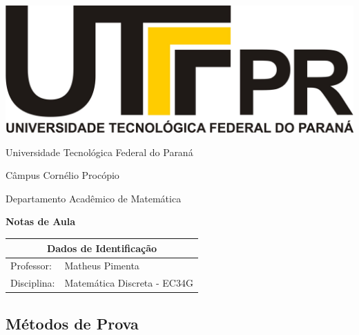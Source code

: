 \documentclass[oneside,a4paper,12pt]{article}
\newcommand{\universidade}{Universidade Tecnológica Federal do Paraná}
\newcommand{\centro}{Câmpus Cornélio Procópio}
\newcommand{\departamento}{Departamento Acadêmico de Matemática}
\newcommand{\curso}{Engenharia da Computação}
\newcommand{\professores}{Matheus Pimenta}
\newcommand{\disciplina}{Matemática Discreta - EC34G}
\begin{document}
	\begin{center}
		\includegraphics[width=\linewidth/8]{logo.jpg}%
	 	\vspace{2pt} 	
		
		\universidade
		\par
		\centro
		\par
		\departamento
		\par
		\par
		\vspace{12pt}
		\LARGE \textbf{Notas de Aula}
		
	\end{center}
	
	\vspace{12pt}
	
	\begin{tabular}{ |l|p{12cm}| }
		
		\hline
		\multicolumn{2}{|c|}{\textbf{Dados de Identificação}} \\
		\hline
		Professor:         &    \professores           \\
		\hline
		Disciplina:        &    \disciplina          \\
		\hline
		
	\end{tabular}
	\vspace{6pt}
	
	
	\begin{snugshade}
		\section{Métodos de Prova}
	\end{snugshade}
\end{document}
